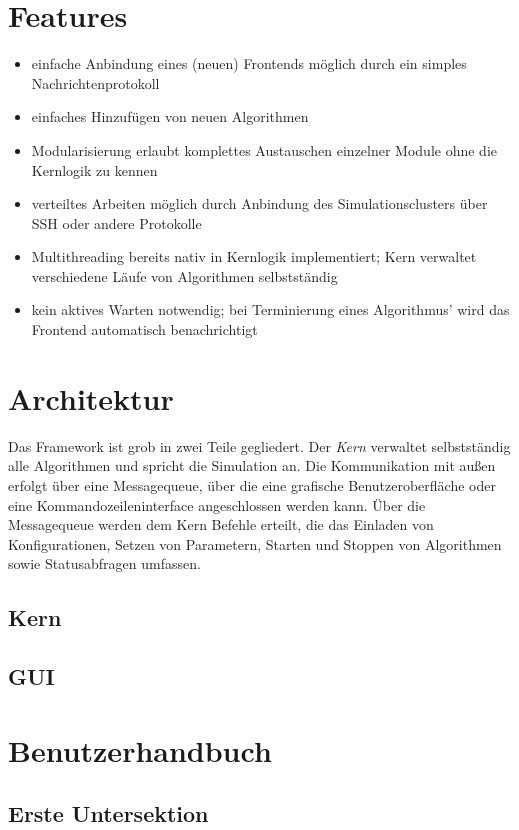 \documentclass[
  a4paper,               %
  twoside,               %
  DIV=12,                %
  BCOR=8mm,              %
  headinclude=true,      %
  footinclude=false,     %
  numbers=noenddot,      %
  headheight=40pt,       %
  11pt]{scrartcl}        %
\begin{document}
\section{Features}
\begin{itemize}
\item einfache Anbindung eines (neuen) Frontends möglich durch ein simples Nachrichtenprotokoll
\item einfaches Hinzufügen von neuen Algorithmen
\item Modularisierung erlaubt komplettes Austauschen einzelner Module ohne die Kernlogik zu kennen
\item verteiltes Arbeiten möglich durch Anbindung des Simulationsclusters über SSH oder andere Protokolle
\item Multithreading bereits nativ in Kernlogik implementiert; Kern verwaltet verschiedene Läufe von Algorithmen selbstständig
\item kein aktives Warten notwendig; bei Terminierung eines Algorithmus' wird das Frontend automatisch benachrichtigt

\end{itemize}


\section{Architektur}
Das Framework ist grob in zwei Teile gegliedert. Der \emph{Kern} verwaltet selbstständig alle Algorithmen und spricht die Simulation an. Die Kommunikation mit außen erfolgt über eine Messagequeue, über die eine grafische Benutzeroberfläche oder eine Kommandozeileninterface angeschlossen werden kann. Über die Messagequeue werden dem Kern Befehle erteilt, die das Einladen von Konfigurationen, Setzen von Parametern, Starten und Stoppen von Algorithmen sowie Statusabfragen umfassen.
\subsection{Kern}

\subsection{GUI}

\section{Benutzerhandbuch}
\subsection{Erste Untersektion}
\end{document}
